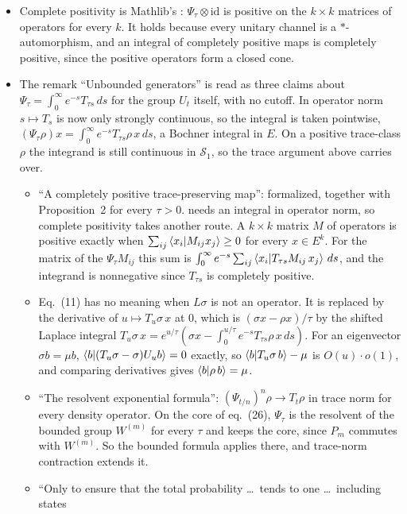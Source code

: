 \documentclass[11pt]{article}
\begin{document}
\begin{itemize}
\item Complete positivity is Mathlib's : $\Psi_\tau \otimes
  \mathrm{id}$ is positive on the $k \times k$ matrices of operators for every $k$. It holds
  because every unitary channel is a $*$-automorphism, and an integral of completely positive
  maps is completely positive, since the positive operators form a closed cone.
\item The remark ``Unbounded generators'' is read as three claims about
  $\Psi_\tau = \int_0^\infty e^{-s}T_{\tau s}\,ds$ for the group $U_t$ itself, with no cutoff. In
  operator norm $s \mapsto T_s$ is now only strongly continuous, so the integral is taken pointwise,
  $(\Psi_\tau\rho)x = \int_0^\infty e^{-s}T_{\tau s}\rho\,x\,ds$, a Bochner integral in $E$. On a
  positive trace-class $\rho$ the integrand is still continuous in $\mathcal{S}_1$, so the
  trace argument above carries over.
  \begin{itemize}
  \item ``A completely positive trace-preserving map'': formalized, together with Proposition~2
    for every $\tau > 0$.  needs an integral in operator
    norm, so complete positivity takes another route. A $k \times k$ matrix $M$ of operators is
    positive exactly when $\sum_{ij}\braket{x_i|M_{ij}x_j} \ge 0$ for every $x \in E^k$. For the
    matrix of the $\Psi_\tau M_{ij}$ this sum is
    $\int_0^\infty e^{-s}\sum_{ij}\braket{x_i|T_{\tau s}M_{ij}\,x_j}\,ds$, and the integrand is
    nonnegative since $T_{\tau s}$ is completely positive.
  \item Eq.~(11) has no meaning when $L\sigma$ is not an operator. It is replaced by the
    derivative of $u \mapsto T_u\sigma\,x$ at $0$, which is $(\sigma x - \rho x)/\tau$ by the shifted
    Laplace integral $T_u\sigma\,x = e^{u/\tau}(\sigma x - \int_0^{u/\tau}e^{-s}T_{\tau s}\rho\,x\,ds)$.
    For an eigenvector $\sigma b = \mu b$, $\braket{b|(T_u\sigma - \sigma)U_ub} = 0$ exactly, so
    $\braket{b|T_u\sigma\,b} - \mu$ is $O(u)\cdot o(1)$, and comparing derivatives gives
    $\braket{b|\rho\,b} = \mu$.
  \item ``The resolvent exponential formula'': $(\Psi_{t/n})^n\rho \to T_t\rho$ in trace norm for
    every density operator. On the core of eq.~(26), $\Psi_\tau$ is the resolvent of the bounded
    group $W^{(m)}$ for every $\tau$ and keeps the core, since $P_m$ commutes with $W^{(m)}$. So the
    bounded formula applies there, and trace-norm contraction extends it.
  \item ``Only to ensure that the total probability \ldots\ tends to one \ldots\ including states

\end{itemize}
\end{itemize}
\end{document}
